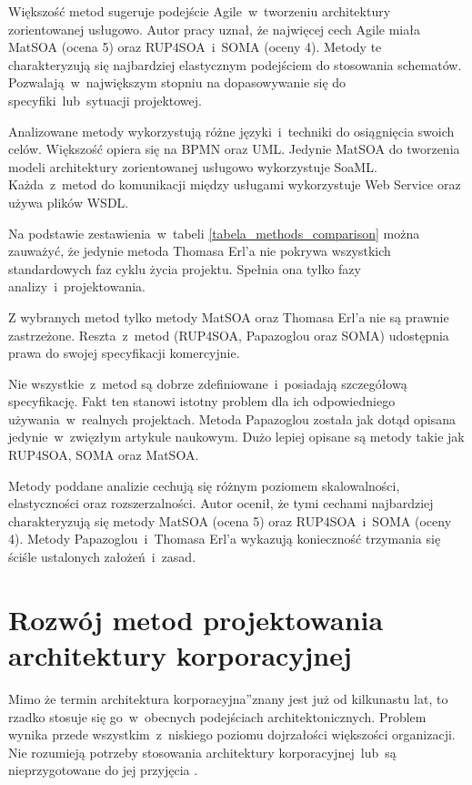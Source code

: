 Większość metod sugeruje podejście Agile~w~tworzeniu architektury zorientowanej usługowo. Autor pracy uznał, że najwięcej cech Agile miała MatSOA (ocena 5) oraz RUP4SOA~i~SOMA (oceny 4). Metody te charakteryzują się najbardziej elastycznym podejściem do stosowania schematów. Pozwalają~w~największym stopniu na dopasowywanie się do specyfiki~lub~sytuacji projektowej.

Analizowane metody wykorzystują różne języki~i~techniki do osiągnięcia swoich celów. Większość opiera się na BPMN oraz UML. Jedynie MatSOA do tworzenia modeli architektury zorientowanej usługowo wykorzystuje SoaML. Każda~z~metod do komunikacji między usługami wykorzystuje Web Service oraz używa plików WSDL.

Na podstawie zestawienia~w~tabeli \ref{tabela_methods_comparison} można zauważyć, że jedynie metoda Thomasa Erl'a nie pokrywa wszystkich standardowych faz cyklu życia projektu. Spełnia ona tylko fazy analizy~i~projektowania.

Z wybranych metod tylko metody MatSOA oraz Thomasa Erl'a nie są prawnie zastrzeżone. Reszta~z~metod (RUP4SOA, Papazoglou oraz SOMA) udostępnia prawa do swojej specyfikacji komercyjnie. 

Nie wszystkie~z~metod są dobrze zdefiniowane~i~posiadają szczegółową specyfikację. Fakt ten stanowi istotny problem dla ich odpowiedniego używania~w~realnych projektach. Metoda Papazoglou została jak dotąd opisana jedynie~w~zwięzłym artykule naukowym. Dużo lepiej opisane są metody takie jak RUP4SOA, SOMA oraz MatSOA. 

Metody poddane analizie cechują się różnym poziomem skalowalności, elastyczności oraz rozszerzalności. Autor ocenił, że tymi cechami najbardziej charakteryzują się metody MatSOA (ocena 5) oraz RUP4SOA~i~SOMA (oceny 4). Metody Papazoglou~i~Thomasa Erl'a wykazują konieczność trzymania się ściśle ustalonych założeń~i~zasad.

\section{Rozwój metod projektowania architektury korporacyjnej}
Mimo że termin \quotedblbase architektura korporacyjna\textquotedblright znany jest już od kilkunastu lat, to rzadko stosuje się go~w~obecnych podejściach architektonicznych. Problem wynika przede wszystkim~z~niskiego poziomu dojrzałości większości organizacji.  Nie rozumieją potrzeby stosowania architektury korporacyjnej~lub~są nieprzygotowane do jej przyjęcia \cite{SobArchKorpProg}. 

